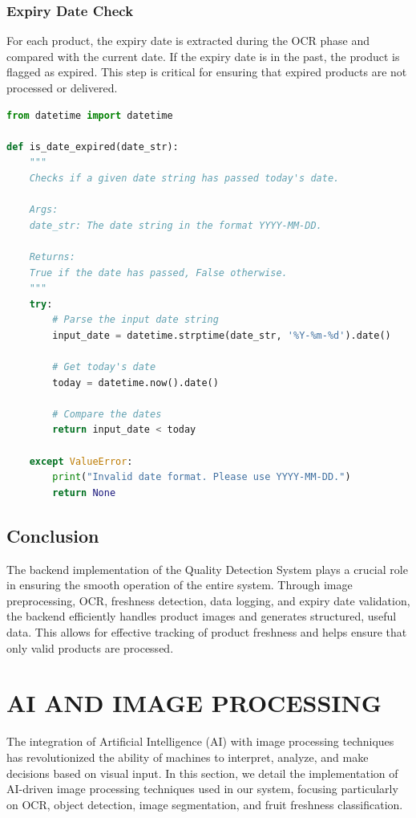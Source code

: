 \documentclass[12pt]{report}
\begin{document}
\subsubsection{Expiry Date Check}
For each product, the expiry date is extracted during the OCR phase and compared with the current date. If the expiry date is in the past, the product is flagged as expired. This step is critical for ensuring that expired products are not processed or delivered.

\begin{lstlisting}[language=Python, caption={Expiry Date Validation Code}]
from datetime import datetime

def is_date_expired(date_str):
    """
    Checks if a given date string has passed today's date.

    Args:
    date_str: The date string in the format YYYY-MM-DD.

    Returns:
    True if the date has passed, False otherwise.
    """
    try:
        # Parse the input date string
        input_date = datetime.strptime(date_str, '%Y-%m-%d').date()
        
        # Get today's date
        today = datetime.now().date()

        # Compare the dates
        return input_date < today

    except ValueError:
        print("Invalid date format. Please use YYYY-MM-DD.")
        return None
\end{lstlisting}

\subsection{Conclusion}
The backend implementation of the Quality Detection System plays a crucial role in ensuring the smooth operation of the entire system. Through image preprocessing, OCR, freshness detection, data logging, and expiry date validation, the backend efficiently handles product images and generates structured, useful data. This allows for effective tracking of product freshness and helps ensure that only valid products are processed.

\section{AI AND IMAGE PROCESSING}
The integration of Artificial Intelligence (AI) with image processing techniques has revolutionized the ability of machines to interpret, analyze, and make decisions based on visual input. In this section, we detail the implementation of AI-driven image processing techniques used in our system, focusing particularly on OCR, object detection, image segmentation, and fruit freshness classification.
\end{document}
